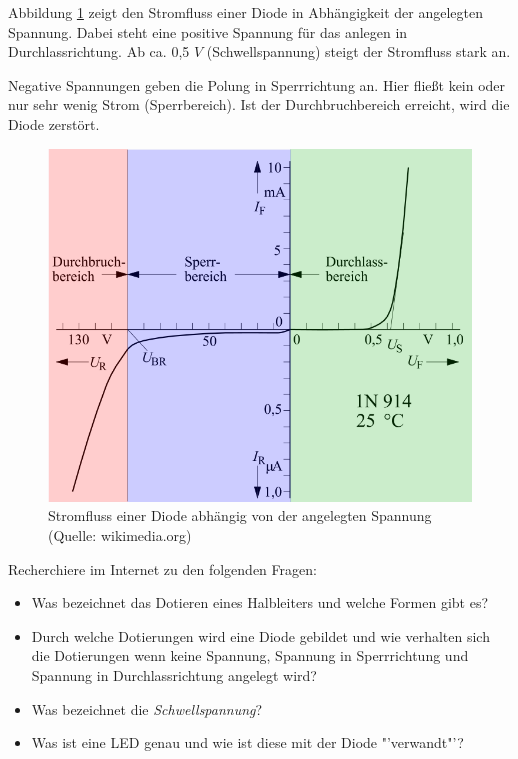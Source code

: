 Abbildung \ref{Abb:DiodeGraph} zeigt den Stromfluss einer Diode in Abhängigkeit der angelegten Spannung.
Dabei steht eine positive Spannung für das anlegen in Durchlassrichtung.
Ab ca. 0,5 $V$ (Schwellspannung) steigt der Stromfluss stark an.

Negative Spannungen geben die Polung in Sperrrichtung an.
Hier fließt kein oder nur sehr wenig Strom (Sperrbereich).
Ist der Durchbruchbereich erreicht, wird die Diode zerstört.


\begin{figure}[ht]
\begin{center}
\includegraphics[scale=.6]{pics/diodegraph}
\caption{Stromfluss einer Diode abhängig von der angelegten Spannung (Quelle: wikimedia.org)}
\label{Abb:DiodeGraph}
\end{center}
\end{figure}


\begin{Zusatzaufgabe}
Recherchiere im Internet zu den folgenden Fragen:
\begin{itemize}
\item Was bezeichnet das Dotieren eines Halbleiters und welche Formen gibt es?
\item Durch welche Dotierungen wird eine Diode gebildet und wie verhalten sich die Dotierungen wenn keine Spannung, Spannung in Sperrrichtung und Spannung in Durchlassrichtung angelegt wird?
\item Was bezeichnet die \emph{Schwellspannung}?
\item Was ist eine LED genau und wie ist diese mit der Diode "'verwandt"'?
\end{itemize}
\end{Zusatzaufgabe}


